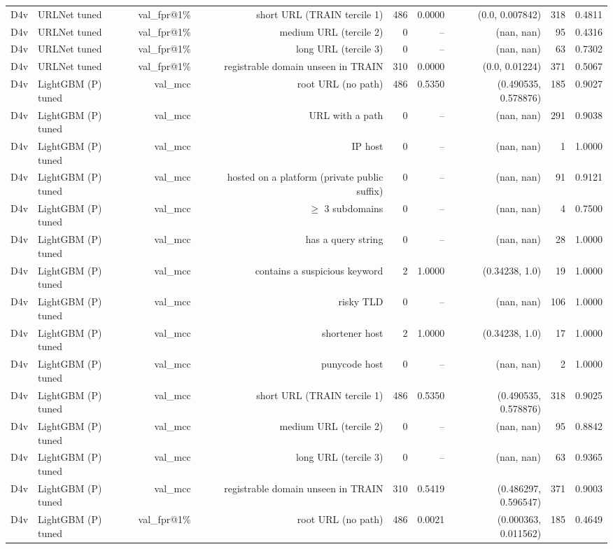 \begin{table}[t]
\begin{tabular}{llrrrrrrr}
D4v & URLNet tuned & val\_fpr@1\% & short URL (TRAIN tercile 1) & 486 & 0.0000 & (0.0, 0.007842) & 318 & 0.4811 \\
D4v & URLNet tuned & val\_fpr@1\% & medium URL (tercile 2) & 0 & -- & (nan, nan) & 95 & 0.4316 \\
D4v & URLNet tuned & val\_fpr@1\% & long URL (tercile 3) & 0 & -- & (nan, nan) & 63 & 0.7302 \\
D4v & URLNet tuned & val\_fpr@1\% & registrable domain unseen in TRAIN & 310 & 0.0000 & (0.0, 0.01224) & 371 & 0.5067 \\
D4v & LightGBM (P) tuned & val\_mcc & root URL (no path) & 486 & 0.5350 & (0.490535, 0.578876) & 185 & 0.9027 \\
D4v & LightGBM (P) tuned & val\_mcc & URL with a path & 0 & -- & (nan, nan) & 291 & 0.9038 \\
D4v & LightGBM (P) tuned & val\_mcc & IP host & 0 & -- & (nan, nan) & 1 & 1.0000 \\
D4v & LightGBM (P) tuned & val\_mcc & hosted on a platform (private public suffix) & 0 & -- & (nan, nan) & 91 & 0.9121 \\
D4v & LightGBM (P) tuned & val\_mcc & $\geq$ 3 subdomains & 0 & -- & (nan, nan) & 4 & 0.7500 \\
D4v & LightGBM (P) tuned & val\_mcc & has a query string & 0 & -- & (nan, nan) & 28 & 1.0000 \\
D4v & LightGBM (P) tuned & val\_mcc & contains a suspicious keyword & 2 & 1.0000 & (0.34238, 1.0) & 19 & 1.0000 \\
D4v & LightGBM (P) tuned & val\_mcc & risky TLD & 0 & -- & (nan, nan) & 106 & 1.0000 \\
D4v & LightGBM (P) tuned & val\_mcc & shortener host & 2 & 1.0000 & (0.34238, 1.0) & 17 & 1.0000 \\
D4v & LightGBM (P) tuned & val\_mcc & punycode host & 0 & -- & (nan, nan) & 2 & 1.0000 \\
D4v & LightGBM (P) tuned & val\_mcc & short URL (TRAIN tercile 1) & 486 & 0.5350 & (0.490535, 0.578876) & 318 & 0.9025 \\
D4v & LightGBM (P) tuned & val\_mcc & medium URL (tercile 2) & 0 & -- & (nan, nan) & 95 & 0.8842 \\
D4v & LightGBM (P) tuned & val\_mcc & long URL (tercile 3) & 0 & -- & (nan, nan) & 63 & 0.9365 \\
D4v & LightGBM (P) tuned & val\_mcc & registrable domain unseen in TRAIN & 310 & 0.5419 & (0.486297, 0.596547) & 371 & 0.9003 \\
D4v & LightGBM (P) tuned & val\_fpr@1\% & root URL (no path) & 486 & 0.0021 & (0.000363, 0.011562) & 185 & 0.4649 \\

\end{tabular}
\end{table}
